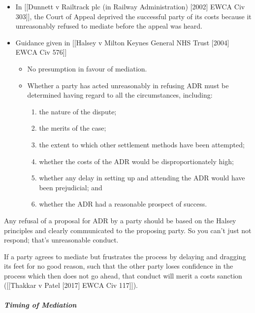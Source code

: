 \documentclass[
]{article}
\providecommand{\tightlist}{%
  \setlength{\itemsep}{0pt}\setlength{\parskip}{0pt}}
\begin{document}
\begin{itemize}
\tightlist
\item
  In {[}{[}Dunnett v Railtrack plc (in Railway Administration)
  {[}2002{]} EWCA Civ 303{]}{]}, the Court of Appeal deprived the
  successful party of its costs because it unreasonably refused to
  mediate before the appeal was heard.
\item
  Guidance given in {[}{[}Halsey v Milton Keynes General NHS Trust
  {[}2004{]} EWCA Civ 576{]}{]}

  \begin{itemize}
  \tightlist
  \item
    No presumption in favour of mediation.
  \item
    Whether a party has acted unreasonably in refusing ADR must be
    determined having regard to all the circumstances, including:

    \begin{enumerate}
    \def\labelenumi{\arabic{enumi}.}
    \tightlist
    \item
      the nature of the dispute;
    \item
      the merits of the case;
    \item
      the extent to which other settlement methods have been attempted;
    \item
      whether the costs of the ADR would be disproportionately high;
    \item
      whether any delay in setting up and attending the ADR would have
      been prejudicial; and
    \item
      whether the ADR had a reasonable prospect of success.
    \end{enumerate}
  \end{itemize}
\end{itemize}

Any refusal of a proposal for ADR by a party should be based on the
Halsey principles and clearly communicated to the proposing party. So
you can't just not respond; that's unreasonable conduct.

If a party agrees to mediate but frustrates the process by delaying and
dragging its feet for no good reason, such that the other party loses
confidence in the process which then does not go ahead, that conduct
will merit a costs sanction ({[}{[}Thakkar v Patel {[}2017{]} EWCA Civ
117{]}{]}).

\hypertarget{timing-of-mediation}{%
\subparagraph{Timing of Mediation}\label{timing-of-mediation}}
\end{document}
